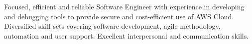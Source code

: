 

\begin{cvparagraph}

Focused, efficient and reliable Software Engineer with experience in developing and debugging tools to provide secure and cost-efficient use of AWS Cloud. Diversified skill sets covering software development, agile methodology, automation and user support. Excellent interpersonal and communication skills. 
\end{cvparagraph}

